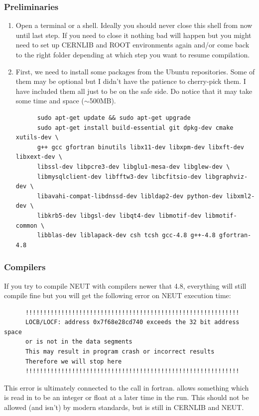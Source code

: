 \subsubsection{Preliminaries}
\begin{enumerate}
\item Open a terminal or a shell. Ideally you should never close this shell from
  now until last step. If you need to close it nothing bad will happen but you
  might need to set up CERNLIB and ROOT environments again and/or come back to
  the right folder depending at which step you want to resume compilation.
\item\label{packages} First, we need to install some packages from the Ubuntu
  repositories. Some of them may be optional but I didn't have the patience to
  cherry-pick them. I have included them all just to be on the safe side. Do
  notice that it may take some time and space ($\sim$500MB).
\begin{lstlisting}
      sudo apt-get update && sudo apt-get upgrade
      sudo apt-get install build-essential git dpkg-dev cmake xutils-dev \
      g++ gcc gfortran binutils libx11-dev libxpm-dev libxft-dev libxext-dev \
      libssl-dev libpcre3-dev libglu1-mesa-dev libglew-dev \
      libmysqlclient-dev libfftw3-dev libcfitsio-dev libgraphviz-dev \
      libavahi-compat-libdnssd-dev libldap2-dev python-dev libxml2-dev \
      libkrb5-dev libgsl-dev libqt4-dev libmotif-dev libmotif-common \
      libblas-dev liblapack-dev csh tcsh gcc-4.8 g++-4.8 gfortran-4.8
\end{lstlisting}
\end{enumerate}

\subsubsection{Compilers}\label{compiler}
If you try to compile NEUT with compilers newer that 4.8, everything will still
compile fine but you will get the following error on NEUT execution time:
\begin{lstlisting}
      !!!!!!!!!!!!!!!!!!!!!!!!!!!!!!!!!!!!!!!!!!!!!!!!!!!!!!!!!!!!
      LOCB/LOCF: address 0x7f68e28cd740 exceeds the 32 bit address space
      or is not in the data segments
      This may result in program crash or incorrect results
      Therefore we will stop here
      !!!!!!!!!!!!!!!!!!!!!!!!!!!!!!!!!!!!!!!!!!!!!!!!!!!!!!!!!!!!
\end{lstlisting}
This error is ultimately connected to the \cleanstyle{FFKEY} call in
fortran. \cleanstyle{FFKEY} allows something which is read in to be an integer
or float at a later time in the run. This should not be allowed (and isn't) by
modern standards, but is still in CERNLIB and NEUT.\@

